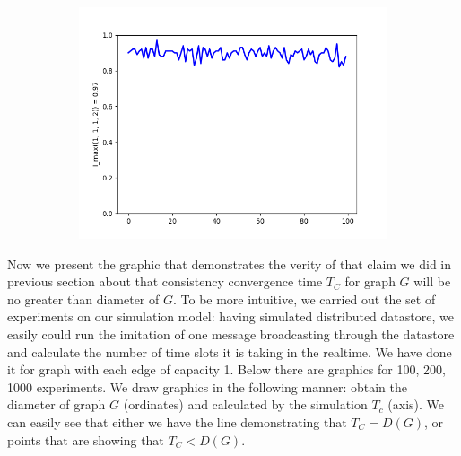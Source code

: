 \documentclass{llncs}
\begin{document}
\begin{figure}
\begin{subfigure}{0.5\linewidth}
\centering\includegraphics[scale=0.4]{images/1-1-1-2-max-consistent-partitions.png}
\end{subfigure}
\end{figure}

\newpage

Now we present the graphic that demonstrates the verity of that claim we did in previous section about that
consistency convergence time $T_C$ for graph $G$ will be no greater than diameter of $G$.
To be more intuitive, we carried out the set of experiments on our simulation model: having simulated distributed datastore, we easily could run the imitation of one message broadcasting through the datastore and calculate the number of time slots it is taking in the realtime. We have done it for graph with each edge of capacity 1. Below there are graphics for 100, 200, 1000 experiments.
We draw graphics in the following manner: obtain the diameter of graph $G$ (ordinates) and calculated by the simulation $T_c$ (axis). We can easily see that either we have the line demonstrating that $T_C = D(G)$, or
points that are showing that $T_C < D(G)$.
\end{document}
